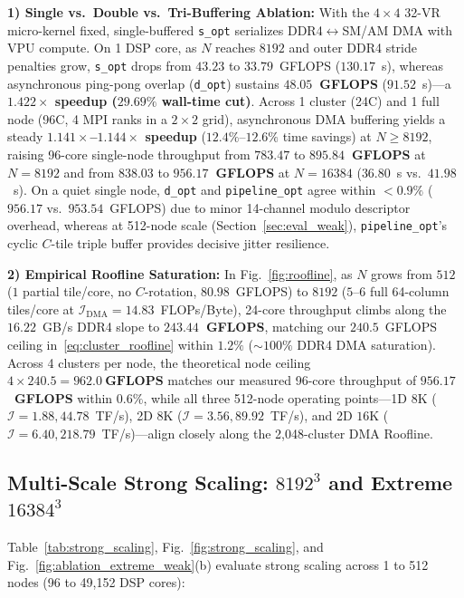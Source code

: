\documentclass[conference]{IEEEtran}
\begin{document}
\textbf{1) Single vs.\ Double vs.\ Tri-Buffering Ablation:} With the $4 \times 4$ 32-VR micro-kernel fixed, single-buffered \texttt{s\_opt} serializes DDR4$\leftrightarrow$SM/AM DMA with VPU compute. On 1 DSP core, as $N$ reaches $8192$ and outer DDR4 stride penalties grow, \texttt{s\_opt} drops from $43.23$ to $33.79$~GFLOPS ($130.17$~s), whereas asynchronous ping-pong overlap (\texttt{d\_opt}) sustains \textbf{$48.05$~GFLOPS} ($91.52$~s)---a \textbf{$1.422\times$ speedup ($29.69\%$ wall-time cut)}. Across 1 cluster (24C) and 1 full node (96C, 4 MPI ranks in a $2 \times 2$ grid), asynchronous DMA buffering yields a steady \textbf{$1.141\times$--$1.144\times$ speedup} ($12.4\%$--$12.6\%$ time savings) at $N \ge 8192$, raising 96-core single-node throughput from $783.47$ to \textbf{$895.84$~GFLOPS} at $N=8192$ and from $838.03$ to \textbf{$956.17$~GFLOPS} at $N=16384$ ($36.80$~s vs.\ $41.98$~s). On a quiet single node, \texttt{d\_opt} and \texttt{pipeline\_opt} agree within $<\!0.9\%$ ($956.17$ vs.\ $953.54$~GFLOPS) due to minor 14-channel modulo descriptor overhead, whereas at 512-node scale (Section~\ref{sec:eval_weak}), \texttt{pipeline\_opt}'s cyclic $C$-tile triple buffer provides decisive jitter resilience.

\textbf{2) Empirical Roofline Saturation:} In Fig.~\ref{fig:roofline}, as $N$ grows from $512$ ($1$ partial tile/core, no $C$-rotation, $80.98$~GFLOPS) to $8192$ ($5$--$6$ full 64-column tiles/core at $\mathcal{I}_{\mathrm{DMA}} = 14.83$~FLOPs/Byte), 24-core throughput climbs along the $16.22$~GB/s DDR4 slope to \textbf{$243.44$~GFLOPS}, matching our $240.5$~GFLOPS ceiling in~\eqref{eq:cluster_roofline} within $1.2\%$ ($\sim\!100\%$ DDR4 DMA saturation). Across 4 clusters per node, the theoretical node ceiling $4 \times 240.5 = \mathbf{962.0~\text{GFLOPS}}$ matches our measured 96-core throughput of \textbf{$956.17$~GFLOPS} within $0.6\%$, while all three 512-node operating points---1D $8\text{K}$ ($\mathcal{I}\!=\!1.88, 44.78$~TF/s), 2D $8\text{K}$ ($\mathcal{I}\!=\!3.56, 89.92$~TF/s), and 2D $16\text{K}$ ($\mathcal{I}\!=\!6.40, 218.79$~TF/s)---align closely along the 2,048-cluster DMA Roofline.

\subsection{Multi-Scale Strong Scaling: $8192^3$ and Extreme $16384^3$}
\label{sec:eval_scaling}
Table~\ref{tab:strong_scaling}, Fig.~\ref{fig:strong_scaling}, and Fig.~\ref{fig:ablation_extreme_weak}(b) evaluate strong scaling across 1 to 512 nodes (96 to 49,152 DSP cores):
\end{document}
